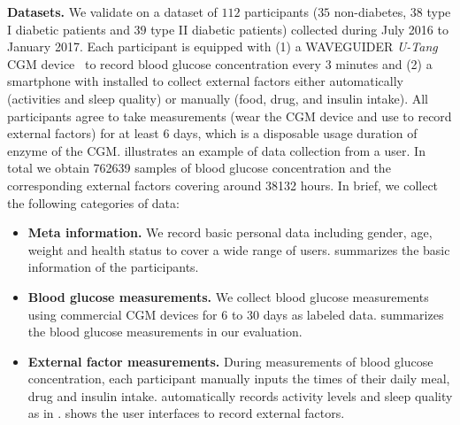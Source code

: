 \textbf{Datasets.}
We validate \sysname on a dataset of $112$ participants ($35$ non-diabetes, $38$ type I diabetic patients and $39$ type II diabetic patients) collected during July 2016 to January 2017.
Each participant is equipped with (1) a WAVEGUIDER \emph{U-Tang} CGM device~\cite{bib:CGM_wave} to record blood glucose concentration every $3$ minutes and (2) a smartphone with \sysname installed to collect external factors either automatically (activities and sleep quality) or manually (food, drug, and insulin intake).
All participants agree to take measurements (\ie wear the CGM device and use \sysname to record external factors) for at least $6$ days, which is a disposable usage duration of enzyme of the CGM.
 illustrates an example of data collection from a user.
In total we obtain 762639 samples of blood glucose concentration and the corresponding external factors covering around 38132 hours.
In brief, we collect the following categories of data:
\begin{itemize}
  \item
  \textbf{Meta information.}
  We record basic personal data including gender, age, weight and health status to cover a wide range of users.
   summarizes the basic information of the participants.
  \item
  \textbf{Blood glucose measurements.}
  We collect blood glucose measurements using commercial CGM devices for 6 to 30 days as labeled data.
   summarizes the blood glucose measurements in our evaluation.
  \item
  \textbf{External factor measurements.}
  During measurements of blood glucose concentration, each participant manually inputs the times of their daily meal, drug and insulin intake.
  \sysname automatically records activity levels and sleep quality as in .
   shows the user interfaces to record external factors.
\end{itemize}

